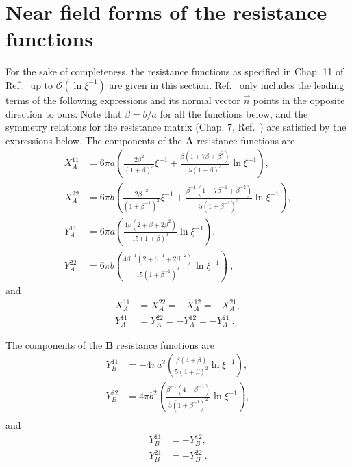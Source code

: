 \documentclass[reprint, amsmath,amssymb,aps,pre,onecolumn,notitlepage%
]{revtex4-1}
\begin{document}
\section{Near field forms of the resistance functions}
\label{sec:components}
For the sake of completeness, the resistance functions as specified in Chap. 11 of Ref.~\cite{KK1991} up to $\mathcal{O}(\ln{\xi^{-1}})$ are given in this section. Ref.~\cite{Mari2014} only includes the leading terms of the following expressions and its normal vector $\vec{n}$ points in the opposite direction to ours. Note that $\beta=b/a$ for all the functions below, and the symmetry relations for the resistance matrix (Chap. 7, Ref.~\cite{KK1991}) are satisfied by the expressions below.
The components of the $\bm{A}$ resistance functions are
\begin{equation}
\begin{split}
	X_A^{11}&= 6 \pi a \left( \frac{2 \beta^2}{(1+\beta)^3}\xi^{-1} + \frac{\beta (1+ 7 \beta + \beta^2)}{5 (1+\beta)^3} \ln{\xi^{-1}}\right),\\
	X_A^{22}&= 6 \pi b \left( \frac{2 \beta^{-2}}{(1+\beta^{-1})^3}\xi^{-1} + \frac{\beta^{-1} (1+ 7 \beta^{-1} + \beta^{-2})}{5 (1+\beta^{-1})^3} \ln{\xi^{-1}}\right),\\
	Y_A^{11}&= 6 \pi a \left(\frac{4 \beta (2+  \beta + 2\beta^2)}{15 (1+\beta)^3} \ln{\xi^{-1}} \right),\\
	Y_A^{22}&= 6 \pi b \left(\frac{4 \beta^{-1} (2+  \beta^{-1} + 2\beta^{-2})}{15 (1+\beta^{-1})^3} \ln{\xi^{-1}} \right)\ ,
\end{split}
\end{equation}
and 
\begin{equation}
\begin{split}
	X^{11}_A &=X^{22}_A=-X^{12}_A=-X^{21}_A,\\
	Y^{11}_A &=Y^{22}_A=-Y^{12}_A=-Y^{21}_A\ .
\end{split}
\end{equation}


The components of the $\bm{B}$ resistance functions are
\begin{equation}
\begin{split}
	Y_B^{11}&= -4 \pi a^2 \left(\frac{ \beta (4+ \beta)}{5 (1+\beta)^2} \ln{\xi^{-1}} \right),\\
	Y_B^{22}&= 4 \pi b^2 \left(\frac{ \beta^{-1} (4+ \beta^{-1})}{5 (1+\beta^{-1})^2} \ln{\xi^{-1}} \right),\\
\end{split}
\end{equation}
and 
\begin{equation}
\begin{split}
	Y^{11}_B &=-Y^{12}_B,\\  Y^{21}_B &=-Y^{22}_B\ .
\end{split}
\end{equation}
\end{document}
